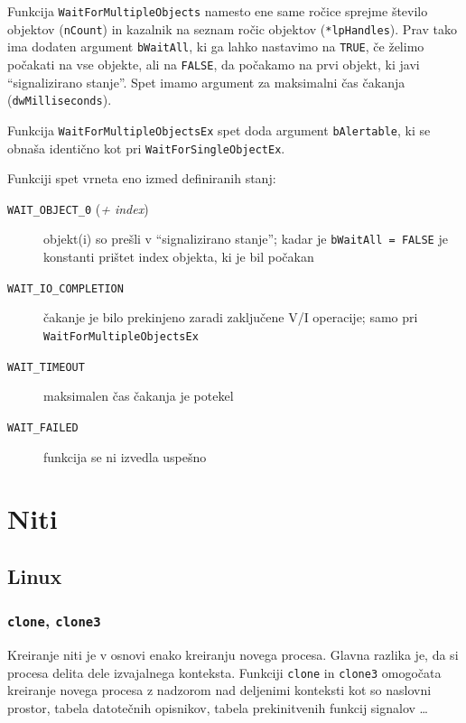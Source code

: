 \documentclass[a4paper,12pt,openright]{book}
\begin{document}
Funkcija \texttt{WaitForMultipleObjects} namesto ene same ročice sprejme število objektov (\texttt{nCount}) in kazalnik na seznam ročic objektov (\texttt{*lpHandles}).
Prav tako ima dodaten argument \texttt{bWaitAll}, ki ga lahko nastavimo na \texttt{TRUE}, če želimo počakati na vse objekte, ali na \texttt{FALSE}, da počakamo na prvi objekt, ki javi ``signalizirano stanje''.
Spet imamo argument za maksimalni čas čakanja (\texttt{dwMilliseconds}).

Funkcija \texttt{WaitForMultipleObjectsEx} spet doda argument \texttt{bAlertable}, ki se obnaša identično kot pri \texttt{WaitForSingleObjectEx}.

Funkciji spet vrneta eno izmed definiranih stanj:
\begin{description}
	\item[\texttt{WAIT\_OBJECT\_0} (\textit{+ index})] objekt(i) so prešli v ``signalizirano stanje''; kadar je \texttt{bWaitAll = FALSE} je konstanti prištet index objekta, ki je bil počakan
	\item[\texttt{WAIT\_IO\_COMPLETION}] čakanje je bilo prekinjeno zaradi zaključene V/I operacije; samo pri \texttt{WaitForMultipleObjectsEx}
	\item[\texttt{WAIT\_TIMEOUT}] maksimalen čas čakanja je potekel
	\item[\texttt{WAIT\_FAILED}] funkcija se ni izvedla uspešno
\end{description}

\section{Niti}

\subsection{Linux} \label{ssec:linux_syscalls:threads}

\subsubsection{\texttt{clone}, \texttt{clone3}}

Kreiranje niti je v osnovi enako kreiranju novega procesa.
Glavna razlika je, da si procesa delita dele izvajalnega konteksta.
Funkciji \texttt{clone} in \texttt{clone3} omogočata kreiranje novega procesa z nadzorom nad deljenimi konteksti kot so naslovni prostor, tabela datotečnih opisnikov, tabela prekinitvenih funkcij signalov \dots
\end{document}
